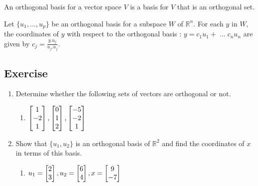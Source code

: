 \documentclass[aima104_lecturenotes_ku.tex]{subfiles}
\begin{document}
\begin{definition}
  An orthogonal basis for a vector space $V$ is a basis for $V$ that is an orthogonal set.
\end{definition}

\begin{theorem}
  \label{orthopro}
  Let $\{u_1, ..., u_p\}$ be an orthogonal basis for a subspace $W$ of $\mathbb{R}^n$. For each $y$ in $W$, the coordinates of $y$ with respect to the orthogonal basis : $y = c_1u_1 + \; ... \; c_n u_n$ are given by $\displaystyle c_j = \frac{y.u_j}{u_j.u_j}$.
\end{theorem}

\subsection{Exercise}
\begin{enumerate}
\item Determine whether the following sets of vectors are orthogonal or not.
  \begin{enumerate}
  \item $
    \begin{bmatrix}
      1 \\ -2 \\ 1
    \end{bmatrix}, \vspace{5mm}
    \begin{bmatrix}
      0 \\ 1 \\ 2
    \end{bmatrix},  \vspace{5mm}
    \begin{bmatrix}
      -5 \\ -2 \\ 1
    \end{bmatrix}$
  \end{enumerate}

\item Show that $\{u_1, u_2\}$ is an orthogonal basis of $\mathbb{R}^2$ and find the coordinates of $x$ in terms of this basis.
  \begin{enumerate}
  \item   $u_1 =
  \begin{bmatrix}
    2 \\ 3
  \end{bmatrix} ,  \vspace{5mm}
  u_2 =
  \begin{bmatrix}
    6 \\ 4
  \end{bmatrix},  \vspace{5mm}
  x =
  \begin{bmatrix}
    9 \\ -7
  \end{bmatrix}
  $


\end{enumerate}
\end{enumerate}
\end{document}
